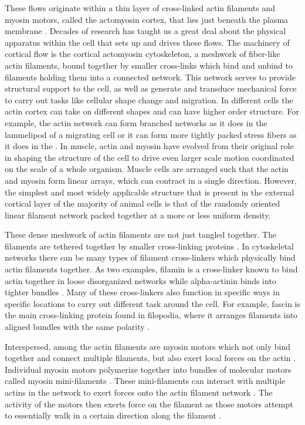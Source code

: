 These flows originate within a thin layer of cross-linked actin filaments and myosin motors, called the actomyosin cortex, that lies just beneath the plasma membrane \cite{Salbreux2012536}.  Decades of research has taught us a great deal about the physical apparatus within the cell that sets up and drives these flows.  The machinery of cortical flow is the cortical actomyosin cytoskeleton, a meshwork of fiber-like actin filaments, bound together by smaller cross-links which bind and unbind to filaments holding them into a connected network.  This network serves to provide structural support to the cell, as well as generate and transduce mechanical force to carry out tasks like cellular shape change and migration. In different cells the actin cortex can take on different shapes and can have higher order structure. For example, the actin network can form branched networks as it does in the lammelipod of a migrating cell or it can form more tightly packed stress fibers as it does in the .  In muscle, actin and myosin have evolved from their original role in shaping the structure of the cell to drive even larger scale motion coordinated on the scale of a whole organism. Muscle cells are arranged such that the actin and myosin form linear arrays, which can contract in a single direction. However, the simplest and most widely applicable structure that is present in the external cortical layer of the majority of animal cells is that of the randomly oriented linear filament network packed together at a more or less uniform density.

These dense meshwork of actin filaments are not just tangled together. The filaments are tethered together by smaller cross-linking proteins \cite{B912163N}.  In cytoskeletal networks there can be many types of filament cross-linkers which physically bind actin filaments together. As two examples, filamin is a cross-linker known to bind actin together in loose disorganized networks while alpha-actinin binds into tighter bundles \cite{B912163N}.   Many of these cross-linkers also function in specific ways in specific locations to carry out different task around the cell.  For example, fascin is the main cross-linking protein found in filopodia, where it arranges filaments into aligned bundles with the same polarity \cite{Ross2000658}.



Interspersed, among the actin filaments are myosin motors which not only bind together and connect multiple filaments, but also exert local forces on the actin \cite{Dasanayake2013}.  Individual myosin motors polymerize together into bundles of molecular motors called myosin mini-filaments \cite{Dasanayake2013}. These mini-filaments can interact with multiple actins in the network to exert forces onto the actin filament network \cite{Bing2000}.  The activity of the motors then exerts force on the filament as those motors attempt to essentially walk in a certain direction along the filament \cite{Bing2000}.


